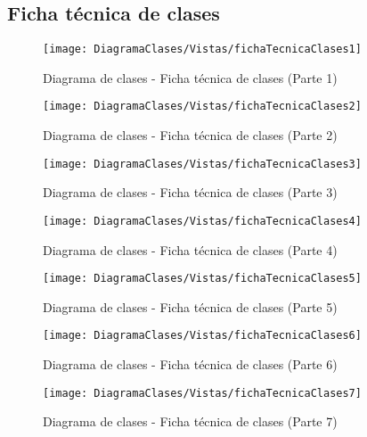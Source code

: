	\subsection{Ficha técnica de clases}
	\begin{figure}[H]
		\centering
		\texttt{[image: DiagramaClases/Vistas/fichaTecnicaClases1]}
		\caption{Diagrama de clases - Ficha técnica de clases (Parte 1)}
	\label{fig:Modelo de clases - Ficha técnica de clases 1}
	\end{figure}
	\begin{figure}[H]
		\centering
		\texttt{[image: DiagramaClases/Vistas/fichaTecnicaClases2]}
		\caption{Diagrama de clases - Ficha técnica de clases (Parte 2)}
	\label{fig:Modelo de clases - Ficha técnica de clases 2}
	\end{figure}
	\begin{figure}[H]
		\centering
		\texttt{[image: DiagramaClases/Vistas/fichaTecnicaClases3]}
		\caption{Diagrama de clases - Ficha técnica de clases (Parte 3)}
	\label{fig:Modelo de clases - Ficha técnica de clases 3}
	\end{figure}
	\begin{figure}[H]
		\centering
		\texttt{[image: DiagramaClases/Vistas/fichaTecnicaClases4]}
		\caption{Diagrama de clases - Ficha técnica de clases (Parte 4)}
	\label{fig:Modelo de clases - Ficha técnica de clases 4}
	\end{figure}
	\begin{figure}[H]
		\centering
		\texttt{[image: DiagramaClases/Vistas/fichaTecnicaClases5]}
		\caption{Diagrama de clases - Ficha técnica de clases (Parte 5)}
	\label{fig:Modelo de clases - Ficha técnica de clases 5}
	\end{figure}
	\begin{figure}[H]
		\centering
		\texttt{[image: DiagramaClases/Vistas/fichaTecnicaClases6]}
		\caption{Diagrama de clases - Ficha técnica de clases (Parte 6)}
	\label{fig:Modelo de clases - Ficha técnica de clases 6}
	\end{figure}
	\begin{figure}[H]
		\centering
		\texttt{[image: DiagramaClases/Vistas/fichaTecnicaClases7]}
		\caption{Diagrama de clases - Ficha técnica de clases (Parte 7)}
	\label{fig:Modelo de clases - Ficha técnica de clases 7}
	\end{figure}

